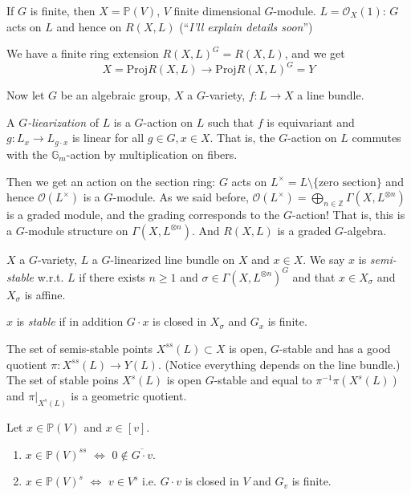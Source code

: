 If $G$ is finite, then  $X= \mathbb{P}(V)$, $V$ finite dimensional $G$-module. 
$L = \mathcal{O}_X(1)$: $G$ acts on $L$ and hence on $R(X,L)$ (``{\it I'll explain
details soon}'')

We have a finite ring extension $R(X,L)^G = R(X,L)$, and we get
$$
X=\text{Proj}R(X,L) \to \text{Proj}R(X,L)^G=Y
$$

\medskip\noindent
Now let $G$ be an algebraic group, $X$ a $G$-variety, $f:L \to X$ a line
bundle.

\begin{definition}
\label{definition-G-linearization}
A  {\it $G$-liearization} of $L$ is a $G$-action on $L$ such that $f$ is
equivariant and $g:L_x \to L_{g\cdot x}$ is linear for all $g \in G, x \in X$.
That is, the $G$-action on $L$ commutes with the $\mathbb{G}_m$-action by
multiplication on fibers.
\end{definition}

Then we get an action on the section ring: $G$ acts on 
$L^{\times}=L\setminus \{\text{zero section}\}$ and hence
$\mathcal{O}(L^{\times})$ is a $G$-module. As we said before,
 $\mathcal{O}(L^{\times})=\bigoplus_{n \in \mathbb{Z}}\Gamma(X,L^{\otimes n})$
is a graded module, and the grading corresponds to the $G$-action! That is, 
this is a $G$-module structure on $\Gamma(X,L^{\otimes n})$. And $R(X,L)$ is a
graded $G$-algebra.

\begin{definition}
\label{definition-semi-stable-line-bundle}
$X$ a $G$-variety, $L$ a $G$-linearized line bundle on $X$ and $x \in X$. We say
$x$ is {\it semi-stable} w.r.t. $L$ if there exists $n \geq 1$ and 
$\sigma \in \Gamma(X,L^{\otimes n})^G$ and that $x \in X_\sigma$ and 
$X_\sigma$ is affine.

$x$ is  {\it stable} if in addition $G\cdot x$ is closed in $X_\sigma$ 
and $G_x$ is finite.
\end{definition}

\begin{theorem}[Mumford]
\label{theorem-Mumford}
The set of semis-stable points $X^{ss}(L)\subset X$ is open, $G$-stable and has 
a good quotient $\pi:X^{ss}(L) \to Y(L)$. (Notice everything depends on the 
line bundle.) The set of stable poins $X^s(L)$ is open $G$-stable and equal to 
$\pi^{-1}\pi(X^s(L))$ and $\pi|_{X^s(L)}$ is a geometric quotient.
\end{theorem}

\begin{proposition}
\label{proposition-on-projectivization-of-V}
Let $x \in \mathbb{P}(V)$ and $x \in [v]$.
\begin{enumerate}
\item $x \in \mathbb{P}(V)^{ss}$ $\iff$ $0 \not \in \overline{G\cdot v}$.
\item $x\in \mathbb{P}(V)^s$ $\iff$ $v \in V^s$ i.e. $G\cdot v$ is closed in $V$
and $G_v$ is finite.
\end{enumerate}
\end{proposition}

